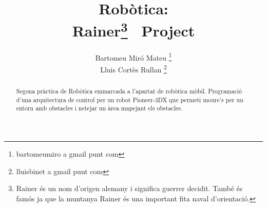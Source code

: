 \documentclass[a4paper,11pt]{scrartcl}
\title{Robòtica: \\ Rainer\footnote{Rainer és un nom d'origen alemany i
significa guerrer decidit. També és famós ja que la muntanya Rainer és una
important fita naval d'orientació.} \ Project}
\author{ Bartomeu Miró Mateu \thanks{bartomeumiro a gmail punt com} \\
	 Lluis Cortès Rullan \thanks{lluisbinet a gmail punt com} }
\begin{document}
  \maketitle

  \begin{abstract}
    Segona pràctica de Robòtica emmarcada a l'apartat de robòtica mòbil.
    Programació d'una arquitectura de control per un robot Pioneer-3DX que
    permeti moure’s per un entorn amb obstacles i netejar un àrea mapejant
    els obstacles.
  \end{abstract}

  \newpage
  \setcounter{page}{2}
  \tableofcontents
  \newpage

  
  
  
  
  
  
  
\end{document}

